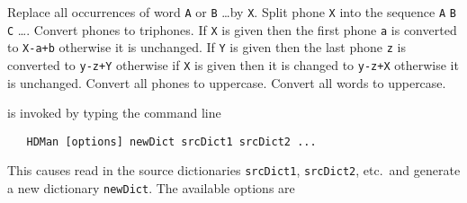 \begin{varlist}
    Replace all occurrences of word \texttt{A} 
       or \texttt{B} \ldots by \texttt{X}.
    Split phone \texttt{X} into the sequence 
      \texttt{A} \texttt{B} \texttt{C} \ldots.
    Convert phones to triphones. If 
        \texttt{X} is given then the first phone \texttt{a} is converted to 
        \texttt{X-a+b} otherwise it is unchanged. If \texttt{Y} is given
          then the last phone \texttt{z} is converted to \texttt{y-z+Y}
           otherwise if \texttt{X} is given
            then it is changed to  \texttt{y-z+X} otherwise it is unchanged.
    Convert all phones to uppercase.
    Convert all words to uppercase.

\end{varlist}


 is invoked by typing the command line
\begin{verbatim}
   HDMan [options] newDict srcDict1 srcDict2 ... 
\end{verbatim}
This causes  read in the source dictionaries \texttt{srcDict1},
\texttt{srcDict2}, etc.\ and generate a new dictionary \texttt{newDict}.
The available options are

